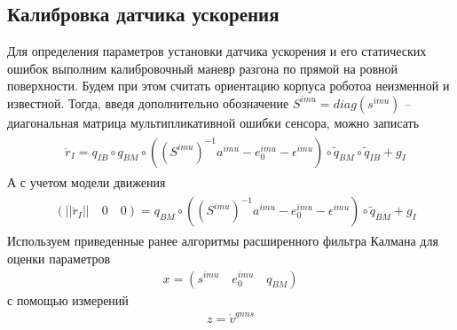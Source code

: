\documentclass[a4paper,12pt]{article}
\begin{document}
\subsection{Калибровка датчика ускорения}
Для определения параметров установки датчика ускорения и его статических ошибок выполним калибровочный маневр разгона по прямой на ровной поверхности. Будем при этом считать ориентацию корпуса роботоа неизменной и известной. Тогда, введя дополнительно обозначение $S^{imu} = diag(s^{imu})$ -- диагональная матрица мультипликативной ошибки сенсора, можно записать
\begin{align} 
\begin{split} \label{eq:imu_calib_1}
&\ddot{r}_{I}  = {q}_{IB} \circ q_{BM} \circ ((S^{imu})^{-1} a^{imu} - e^{imu}_0 - \epsilon^{imu}) \circ \tilde{q}_{BM} \circ \tilde{q}_{IB} + g_I
\end{split}
\end{align}
А с учетом модели движения
\begin{align} 
\begin{split} \label{eq:imu_calib_2}
&(||\ddot{r}_{I}|| \quad 0 \quad 0)  = q_{BM} \circ ((S^{imu})^{-1} a^{imu} - e^{imu}_0 - \epsilon^{imu}) \circ \tilde{q}_{BM} + g_I
\end{split}
\end{align}
Используем приведенные ранее алгоритмы расширенного фильтра Калмана для оценки параметров
\begin{align} 
x = (s^{imu} \quad e^{imu}_0 \quad {q}_{BM})
\end{align}
с помощью измерений 
\begin{align} 
z = \dot{v}^{gnns}
\end{align}
\end{document}
